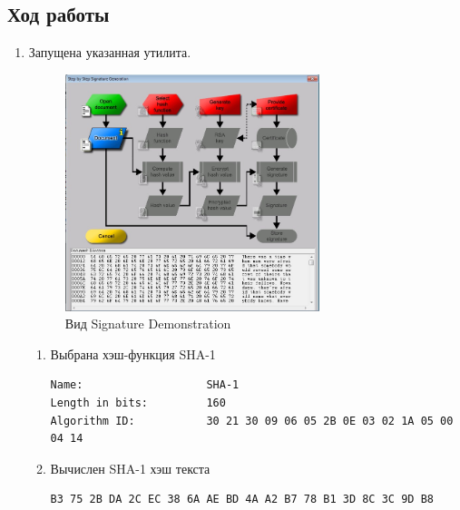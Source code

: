 \documentclass[a4paper, 14pt]{extarticle}
\begin{document}
\subsection{Ход работы}
\begin{enumerate}
    \item Запущена указанная утилита.
    \begin{figure}[h]
        \centering
        \includegraphics[width=0.7\textwidth]{img/S013.jpg}
        \caption{Вид Signature Demonstration}%
        \label{img:4:1}
    \end{figure}
    \FloatBarrier{}
    \begin{enumerate}
        \item Выбрана хэш-функция SHA-1
        \begin{lstlisting}[style=framed_num,caption=хэш-функция]
Name:                   SHA-1 
Length in bits:         160
Algorithm ID:           30 21 30 09 06 05 2B 0E 03 02 1A 05 00 04 14
        \end{lstlisting}
        \item Вычислен SHA-1 хэш текста
        \begin{lstlisting}[style=framed_num,caption=хэш текста]
B3 75 2B DA 2C EC 38 6A AE BD 4A A2 B7 78 B1 3D 8C 3C 9D B8
        \end{lstlisting}


\end{enumerate}
\end{enumerate}
\end{document}
